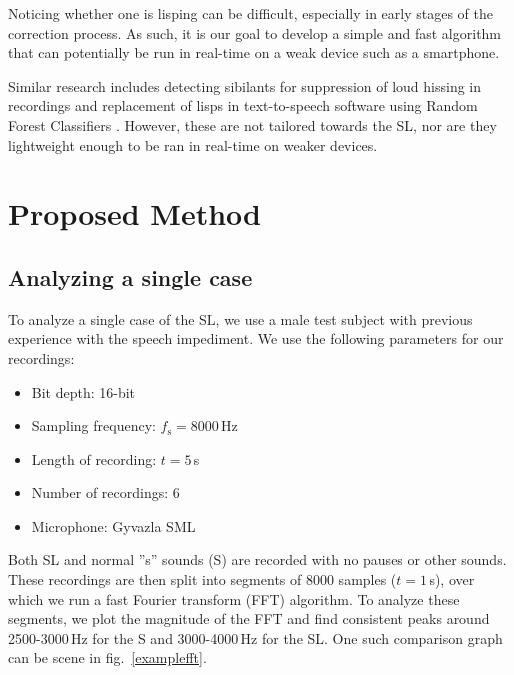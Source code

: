 \documentclass{IEEEtran}
\begin{document}
Noticing whether one is lisping can be difficult,
especially in early stages of the correction process.
As such,
it is our goal to develop a simple and fast algorithm that can potentially be run in real-time on a weak device such as a smartphone.

Similar research includes detecting sibilants for suppression of loud hissing in recordings \cite{Gonzalez} \cite{de-ess} and replacement of lisps in text-to-speech software using Random Forest Classifiers \cite{Itagi}.
However,
these are not tailored towards the SL,
nor are they lightweight enough to be ran in real-time on weaker devices.

\section{Proposed Method}

\subsection{Analyzing a single case}\label{analyze}

To analyze a single case of the SL,
we use a male test subject with previous experience with the speech impediment.
We use the following parameters for our recordings:

\begin{itemize}
	\item Bit depth: 16-bit
	\item Sampling frequency: \(f_\mathrm{s} = 8000\)\,Hz
	\item Length of recording: \(t = 5\)\,s
	\item Number of recordings: 6
	\item Microphone: Gyvazla SML
\end{itemize}

Both SL and normal ''s'' sounds (S) are recorded with no pauses or other sounds.
These recordings are then split into segments of 8000 samples (\(t = 1\)\,s),
over which we run a fast Fourier transform (FFT) algorithm.
To analyze these segments, we plot the magnitude of the FFT and find consistent peaks around 2500-3000\,Hz for the S and 3000-4000\,Hz for the SL.
One such comparison graph can be scene in fig.\ \ref{examplefft}.
\end{document}
